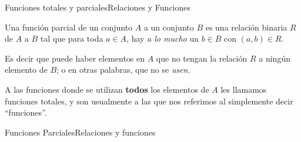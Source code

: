 \documentclass[spanish, c]{beamer}
\begin{document}
\begin{frame}{Funciones totales y parciales}{Relaciones y Funciones}

    \begin{definition}
        Una \alert{función parcial} de un conjunto $A$ a un conjunto $B$ es una relación binaria $R$ de $A$ a $B$ tal que para toda $a \in A$, hay \textit{a lo mucho} un $b \in B$ con $(a,b) \in R$.
    \end{definition} \pause
    \bigskip
    Es decir que puede haber elementos en $A$ que no tengan la relación $R$ a ningún elemento de $B$; o en otras palabras, que no se \textit{usen}. \pause
    
    \bigskip

    A las funciones donde se utilizan \textbf{todos} los elementos de $A$ les llamamos \alert{funciones totales}, y son usualmente a las que nos referimos al simplemente decir ``funciones''.
\end{frame}

\begin{frame}{Funciones Parciales}{Relaciones y funciones}
    \begin{center}
    \end{center}
\end{frame}
\end{document}
